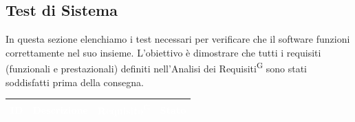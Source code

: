 \documentclass[a4paper, 11pt]{article}
\renewcommand{\arraystretch}{1.4} %
\begin{document}
\subsection{Test di Sistema}
In questa sezione elenchiamo i test necessari per verificare che il software funzioni correttamente nel suo insieme. L'obiettivo è dimostrare che tutti i requisiti (funzionali e prestazionali) definiti nell'Analisi dei Requisiti\textsuperscript{G} sono stati soddisfatti prima della consegna.

\renewcommand{\arraystretch}{1.5}
\setlength{\LTleft}{0pt plus 1fill}\setlength{\LTright}{0pt plus 1fill}\begin{longtable}{>{\centering\arraybackslash}m{1.2cm} >{\raggedright\arraybackslash}p{8.2cm} >{\centering\arraybackslash}m{2.5cm} >{\centering\arraybackslash}m{1.2cm}}
\rowcolor{AccentColor}
\textcolor{white}{\textbf{ID}} & \textcolor{white}{\textbf{Descrizione}} & \textcolor{white}{\textbf{Requisito\textsuperscript{G}}} & \textcolor{white}{\textbf{Stato}} \\
\endhead


\end{longtable}
\end{document}
